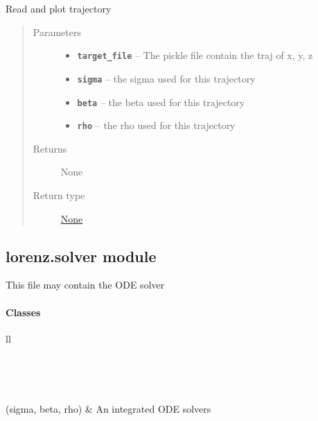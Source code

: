 \documentclass[letterpaper,10pt,english]{sphinxmanual}
\begin{document}

\begin{fulllineitems}
\label{_autosummary/lorenz:lorenz.run.run_load_plot}
Read and plot trajectory
\begin{quote}\begin{description}
\item[{Parameters}] \leavevmode\begin{itemize}
\item {} 
\textbf{\texttt{target\_file}} -- The pickle file contain the traj of x, y, z

\item {} 
\textbf{\texttt{sigma}} -- the sigma used for this trajectory

\item {} 
\textbf{\texttt{beta}} -- the beta used for this trajectory

\item {} 
\textbf{\texttt{rho}} -- the rho used for this trajectory

\end{itemize}

\item[{Returns}] \leavevmode
None

\item[{Return type}] \leavevmode
\href{https://docs.python.org/library/constants.html\#None}{None}

\end{description}\end{quote}

\end{fulllineitems}



\subsection{lorenz.solver module}
\label{_autosummary/lorenz:module-lorenz.solver}\label{_autosummary/lorenz:lorenz-solver-module}
This file may contain the ODE solver
\paragraph{Classes}

\begin{longtable}{ll}
\hline
\endfirsthead

%
{{}} \\
\hline
\endhead

\hline {} \\ \hline
\endfoot

\endlastfoot


{\hyperref[_autosummary/lorenz:lorenz.solver.ODE_solvers]{}}(sigma, beta, rho)
 & 
An integrated ODE solvers
\\
\hline\end{longtable}
\end{document}
